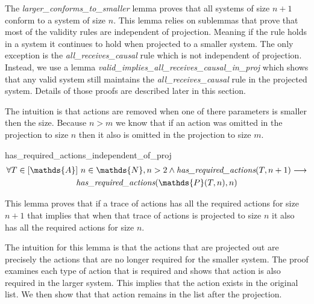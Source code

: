 \documentclass[runningheads]{llncs}
\newcommand{\action}{\mathds{A}}
\newcommand{\listaction}{[\action]}
\newcommand{\projectsize}[2]{\mathds{P}(#1, #2)}
\newcommand{\hra}[2]{\emph{has\_required\_actions}(#1, #2)}
\begin{document}
The \emph{larger\_conforms\_to\_smaller} lemma proves that all systems of size $n+1$ conform to a system of size $n$. This lemma relies on sublemmas that prove that most of the validity rules are independent of projection. Meaning if the rule holds in a system it continues to hold when projected to a smaller system. The only exception is the \emph{all\_receives\_causal} rule which is not independent of projection. Instead, we use a lemma \emph{valid\_implies\_all\_receives\_causal\_in\_proj} which shows that any valid system still maintains the \emph{all\_receives\_causal} rule in the projected system. Details of those proofs are described later in this section. 


The intuition is that actions are removed when one of there parameters is smaller then the size. Because $n>m$ we know that if an action was omitted in the projection to size $n$ then it also is omitted in the projection to size $m$.  

\begin{lemma}{has\_required\_actions\_independent\_of\_proj}
\begin{multline*}
\forall T \in \listaction\ n \in \mathds{N}, n > 2 \wedge \hra{T}{n+1} \longrightarrow \\
\hra{\projectsize{T}{n}}{n}
\end{multline*}
\end{lemma}


This lemma proves that if a trace of actions has all the required actions for size $n+1$ that implies that when that trace of actions is projected to size $n$ it also has all the required actions for size $n$. 

The intuition for this lemma is that the actions that are projected out are precisely the actions that are no longer required for the smaller system. The proof examines each type of action that is required and shows that action is also required in the larger system. This implies that the action exists in the original list. We then show that that action remains in the list after the projection.
\end{document}
